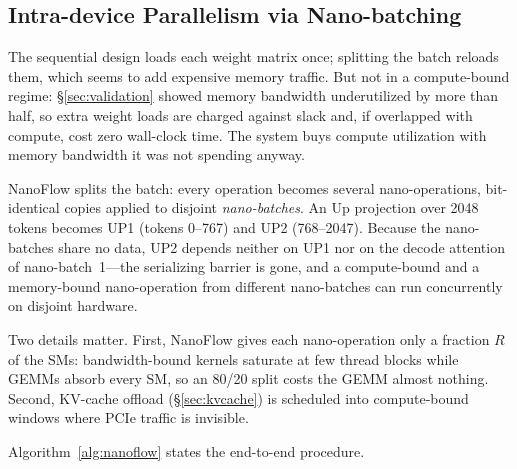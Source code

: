 \documentclass[manuscript,review]{acmart}
\newcommand{\nf}{NanoFlow\xspace}   %
\begin{document}
\subsection{Intra-device Parallelism via Nano-batching}
\label{sec:intradevice}

The sequential design loads each weight matrix once; splitting the batch reloads them, which seems to add 
expensive memory traffic. But not in a compute-bound regime: \S\ref{sec:validation} showed memory bandwidth 
underutilized by more than half, so extra weight loads are charged against slack and, if overlapped with 
compute, cost zero wall-clock time. The system buys compute utilization with memory bandwidth it was not 
spending anyway.

\nf splits the batch: every operation becomes several nano-operations, bit-identical copies applied to 
disjoint \emph{nano-batches}. An Up projection over 2048 tokens becomes UP1 (tokens 0--767) and UP2 (768--2047). 
Because the nano-batches share no data, UP2 depends neither on UP1 nor on the decode attention of 
nano-batch~1---the serializing barrier is gone, and a compute-bound and a memory-bound nano-operation from 
different nano-batches can run concurrently on disjoint hardware.

Two details matter. First, \nf gives each nano-operation only a fraction $R$ of the SMs: bandwidth-bound 
kernels saturate at few thread blocks while GEMMs absorb every SM, so an 80/20 split costs the GEMM almost 
nothing. Second, KV-cache offload (\S\ref{sec:kvcache}) is scheduled into compute-bound windows where PCIe 
traffic is invisible.

Algorithm~\ref{alg:nanoflow} states the end-to-end procedure.
\end{document}
